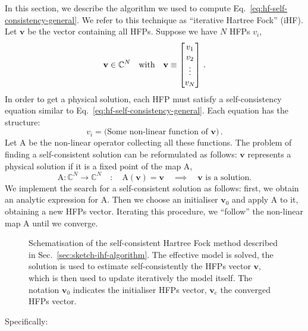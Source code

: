 In this section, we describe the algorithm we used to compute Eq.~\eqref{eq:hf-self-consistency-general}. We refer to this technique as ``iterative Hartree Fock'' (iHF). Let $\mathbf{v}$ be the vector containing all HFPs. Suppose we have $N$ HFPs $v_i$,
\[
	\mathbf{v} \in \mathbb{C}^N
	\qq{with}
	\mathbf{v} \equiv \begin{bmatrix}
		v_1 \\ v_2 \\ \vdots \\ v_N
	\end{bmatrix} \, .
\]
In order to get a physical solution, each HFP must satisfy a self-consistency equation similar to Eq.~\eqref{eq:hf-self-consistency-general}. Each equation has the structure:
\[
	v_i = \text{(Some non-linear function of $\mathbf{v}$)} \, .
\]
Let $\mathrm{A}$ be the non-linear operator collecting all these functions. The problem of finding a self-consistent solution can be reformulated as follows: $\mathbf{v}$ represents a physical solution if it is a fixed point of the map $\mathrm{A}$,
\begin{equation}\label{eq:hf-A-fixed-point}
	\mathrm{A} \colon \mathbb{C}^N \to \mathbb{C}^N
	\quad\colon\quad
	\mathrm{A} (\mathbf{v}) = \mathbf{v}
	\quad\implies\quad
	\text{$\mathbf{v}$ is a solution.}
\end{equation}
We implement the search for a self-consistent solution as follows: first, we obtain an analytic expression for $\mathrm{A}$. Then we choose an initialiser $\mathbf{v}_0$ and apply $\mathrm{A}$ to it, obtaining a new HFPs vector. Iterating this procedure, we ``follow'' the non-linear map $\mathrm{A}$ until we converge.
%
\begin{figure}
	\centering
	
	\caption{Schematisation of the self-consistent Hartree Fock method described in Sec.~\ref{sec:sketch-ihf-algorithm}. The effective model is solved, the solution is used to estimate self-consistently the HFPs vector $\mathbf{v}$, which is then used to update iteratively the model itself. The notation $\mathbf{v}_0$ indicates the initialiser HFPs vector, $\mathbf{v}_\mathrm{c}$ the converged HFPs vector.}
	\label{fig:effective-model-scheme}
\end{figure}
%
Specifically:
